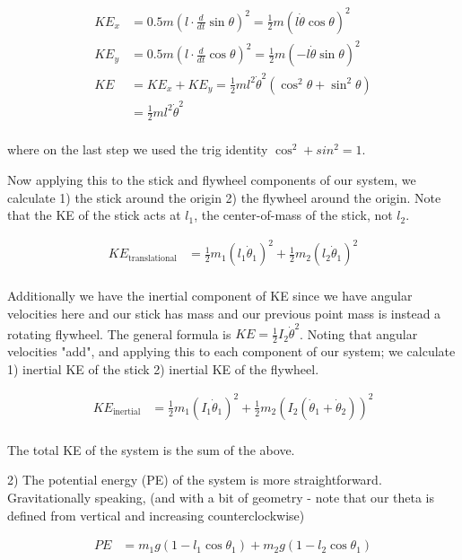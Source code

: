 \documentclass[conference]{IEEEtran}
\begin{document}
\begin{align}
    KE_x &= 0.5 m (l \cdot \frac{d}{dt} \sin \theta)^2 = \frac{1}{2} m (l \dot\theta \cos \theta)^2 \\
    KE_y &= 0.5 m (l \cdot \frac{d}{dt} \cos \theta)^2  = \frac{1}{2} m (- l \dot\theta \sin\theta)^2 \\
    KE &= KE_x + KE_y = \frac{1}{2} m l^2 \dot \theta^2 (\cos^2 \theta + \sin^2 \theta) \\
       &= \frac{1}{2} m l^2 \dot\theta^2 \\
\end{align}

where on the last step we used the trig identity $\cos^2 + sin^2 = 1$.

Now applying this to the stick and flywheel components of our system, we
calculate 1) the stick around the origin 2) the flywheel around the origin. Note
that the KE of the stick acts at $l_1$, the center-of-mass of the stick, not
$l_2$.

\begin{align}
    KE_{\text{translational}} &= \frac{1}{2} m_1 (l_1 \dot\theta_1)^2 + \frac{1}{2} m_2 (l_2 \dot\theta_1)^2\\
\end{align}

Additionally we have the inertial component of KE since we have angular
velocities here and our stick has mass and our previous point mass is instead a rotating
flywheel. The general formula is $KE = \frac{1}{2} I_2 \dot\theta^2$.
Noting that angular velocities "add", and applying this to each component of our
system; we calculate 1) inertial KE of the stick 2) inertial KE of the flywheel.

\begin{align}
    KE_{\text{inertial}} &= \frac{1}{2} m_1 (I_1 \dot\theta_1)^2 + \frac{1}{2}
    m_2 (I_2 (\dot\theta_1 + \dot\theta_2))^2\\
\end{align}

The total KE of the system is the sum of the above.

2) The potential energy (PE) of the system is more straightforward. Gravitationally
speaking, (and with a bit of geometry - note that our theta is defined from
vertical and increasing counterclockwise)

\begin{align}
    PE &= m_1 g (1 - l_1 \cos\theta_1) + m_2 g (1 - l_2 \cos\theta_1)
\end{align}
\end{document}
